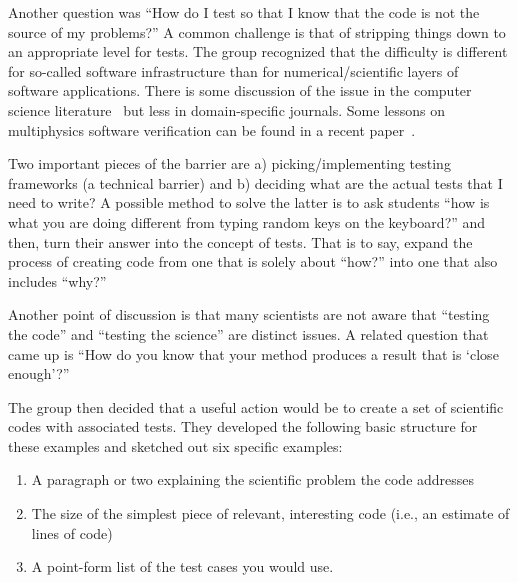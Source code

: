 \documentclass[11pt, oneside]{amsart}
\newcommand{\katznote}[1]{ {\textcolor{magenta}    { ***Dan:      #1 }}}
\newcommand{\clunenote}[1]{ {\textcolor{orange}    { ***Tom:      #1 }}}
\begin{document}
Another question was ``How do I test so that I know that the code is not the
source of my problems?'' A common challenge is that of stripping things down to
an appropriate level for tests. The group recognized that the difficulty is
different for so-called software infrastructure than for numerical/scientific
layers of software applications.
%
%
%
%
There is some discussion of the issue in the computer science
literature~\cite{hook1,hook2} but less in domain-specific journals. Some lessons
on multiphysics software verification can be found in a recent
paper~\cite{dubey-FLASH}.

Two important pieces of the barrier are a) picking/implementing testing
frameworks (a technical barrier) and b) deciding what are the actual tests that
I need to write? A possible method to solve the latter is to ask students ``how
is what you are doing different from typing random keys on the keyboard?'' and
then, turn their answer into the concept of tests. That is to say, expand the
process of creating code from one that is solely about ``how?'' into one that
also includes ``why?''

Another point of discussion is that many scientists are not aware that ``testing
the code'' and ``testing the science'' are distinct issues. A related question
that came up is ``How do you know that your method produces a result that is
`close enough'?''

The group then decided that a useful action would be to create a set of
scientific codes with associated tests. They developed the following basic
structure for these examples and sketched out six specific examples:
\begin{enumerate}

\item A paragraph or two explaining the scientific problem the code addresses

\item The size of the simplest piece of relevant, interesting code (i.e., an
estimate of lines of code)

\item A point-form list of the test cases you would use.

\end{enumerate}
\end{document}

